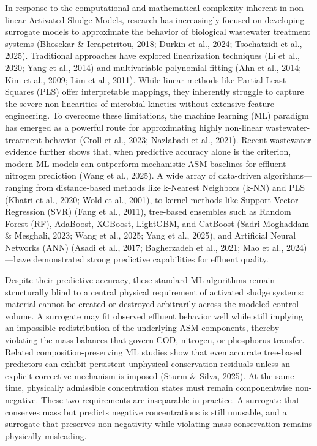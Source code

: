 \documentclass[11pt]{article}
\begin{document}
In response to the computational and mathematical complexity inherent in non-linear Activated Sludge Models, research has increasingly focused on developing surrogate models to approximate the behavior of biological wastewater treatment systems (Bhosekar \& Ierapetritou, 2018; Durkin et al., 2024; Tsochatzidi et al., 2025). Traditional approaches have explored linearization techniques (Li et al., 2020; Yang et al., 2014) and multivariable polynomial fitting (Ahn et al., 2014; Kim et al., 2009; Lim et al., 2011). While linear methods like Partial Least Squares (PLS) offer interpretable mappings, they inherently struggle to capture the severe non-linearities of microbial kinetics without extensive feature engineering. To overcome these limitations, the machine learning (ML) paradigm has emerged as a powerful route for approximating highly non-linear wastewater-treatment behavior (Croll et al., 2023; Nazlabadi et al., 2021). Recent wastewater evidence further shows that, when predictive accuracy alone is the criterion, modern ML models can outperform mechanistic ASM baselines for effluent nitrogen prediction (Wang et al., 2025). A wide array of data-driven algorithms---ranging from distance-based methods like k-Nearest Neighbors (k-NN) and PLS (Khatri et al., 2020; Wold et al., 2001), to kernel methods like Support Vector Regression (SVR) (Fang et al., 2011), tree-based ensembles such as Random Forest (RF), AdaBoost, XGBoost, LightGBM, and CatBoost (Sadri Moghaddam \& Mesghali, 2023; Wang et al., 2025; Yang et al., 2025), and Artificial Neural Networks (ANN) (Asadi et al., 2017; Bagherzadeh et al., 2021; Mao et al., 2024)---have demonstrated strong predictive capabilities for effluent quality. 

Despite their predictive accuracy, these standard ML algorithms remain structurally blind to a central physical requirement of activated sludge systems: material cannot be created or destroyed arbitrarily across the modeled control volume. A surrogate may fit observed effluent behavior well while still implying an impossible redistribution of the underlying ASM components, thereby violating the mass balances that govern COD, nitrogen, or phosphorus transfer. Related composition-preserving ML studies show that even accurate tree-based predictors can exhibit persistent unphysical conservation residuals unless an explicit corrective mechanism is imposed (Sturm \& Silva, 2025). At the same time, physically admissible concentration states must remain componentwise non-negative. These two requirements are inseparable in practice. A surrogate that conserves mass but predicts negative concentrations is still unusable, and a surrogate that preserves non-negativity while violating mass conservation remains physically misleading.
\end{document}
